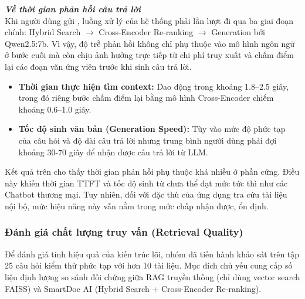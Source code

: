 \documentclass[10pt, conference, a4paper, compsocconf]{IEEEtran}
\begin{document}
\vspace{1 em}
\textit{\textbf{Về thời gian phản hồi câu trả lời}}
\vspace{0.5em}
\\Khi người dùng gửi , luồng xử lý của hệ thống phải lần lượt đi qua ba giai đoạn chính: Hybrid Search $\rightarrow$ Cross-Encoder Re-ranking $\rightarrow$ Generation bởi Qwen2.5:7b. Vì vậy, độ trễ phản hồi không chỉ phụ thuộc vào mô hình ngôn ngữ ở bước cuối mà còn chịu ảnh hưởng trực tiếp từ chi phí truy xuất và chấm điểm lại các đoạn văn ứng viên trước khi sinh câu trả lời.

\begin{itemize}
  \item \textbf{Thời gian thực hiện tìm context:} Dao động trong khoảng 1.8--2.5 giây, trong đó riêng bước chấm điểm lại bằng mô hình Cross-Encoder chiếm khoảng 0.6--1.0 giây.
  \item \textbf{Tốc độ sinh văn bản (Generation Speed):} Tùy vào mức độ phức tạp của câu hỏi và độ dài câu trả lời nhưng trung bình người dùng phải đợi khoảng 30-70 giây để nhận được câu trả lời từ LLM.
\end{itemize}

Kết quả trên cho thấy thời gian phản hồi phụ thuộc khá nhiều ở phần cứng. Điều này khiến thời gian TTFT và tốc độ sinh từ chưa thể đạt mức tức thì như các Chatbot thương mại. Tuy nhiên, đối với đặc thù của ứng dụng tra cứu tài liệu nội bộ, mức hiệu năng này vẫn nằm trong mức chấp nhận được, ổn định.

\vspace{1em}
\subsubsection{Đánh giá chất lượng truy vấn (Retrieval Quality)} 
Để đánh giá tính hiệu quả của kiến trúc lõi, nhóm đã tiến hành khảo sát trên tập 25 câu hỏi kiểm thử phức tạp với hơn 10 tài liệu. Mục đích chủ yếu cung cấp số liệu định lượng so sánh đối chứng giữa RAG truyền thống (chỉ dùng vector search FAISS) và SmartDoc AI (Hybrid Search + Cross-Encoder Re-ranking).
\vspace{0.5em}
\end{document}
